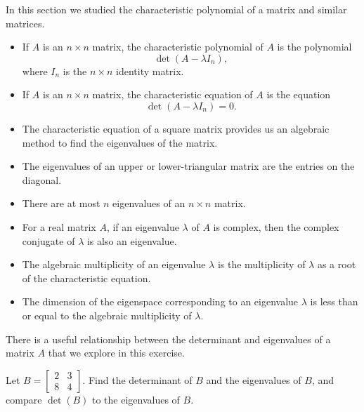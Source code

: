 \begin{example}
\end{example}

\label{sec:chareq_summ}
In this section we studied the characteristic polynomial of a matrix and similar matrices.
\begin{itemize}
\item If $A$ is an $n \times n$ matrix, the characteristic polynomial of $A$ is the polynomial
\[\det(A-\lambda I_n),\]
where $I_n$ is the $n \times n$ identity matrix.
\item If $A$ is an $n \times n$ matrix, the characteristic equation of $A$ is the equation
\[\det(A-\lambda I_n) = 0.\]
\item The characteristic equation of a square matrix provides us an algebraic method to find the eigenvalues of the matrix.
\item The eigenvalues of an upper or lower-triangular matrix are the entries on the diagonal.
\item There are at most $n$ eigenvalues of an $n\times n$ matrix.
\item For a real matrix $A$, if an eigenvalue $\lambda$ of $A$ is complex, then the complex conjugate of $\lambda$ is also an eigenvalue.
\item The algebraic multiplicity of an eigenvalue $\lambda$ is the multiplicity of $\lambda$ as a root of the characteristic equation.
\item The dimension of the eigenspace corresponding to an eigenvalue $\lambda$ is less than or equal to the algebraic multiplicity of $\lambda$.

\end{itemize}





\label{sec:chareq_exer}
\be
	
\item \label{ex:determinant_eigenvalues} There is a useful relationship between the determinant and eigenvalues of a matrix $A$ that we explore in this exercise. 
	\ba
	\item Let $B = \left[ \begin{array}{cc} 2&3\\8&4 \end{array} \right]$. Find the determinant of $B$ and the eigenvalues of $B$, and compare $\det(B)$ to the eigenvalues of $B$.
	
